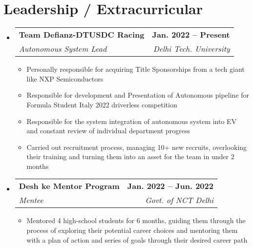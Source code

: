 \documentclass[letterpaper,11pt]{article}
\makeatletter
\newcommand{\resumeItem}[1]{
  \item\small{
    {#1 \vspace{-2pt}}
  }
}
\newcommand{\resumeSubheading}[4]{
  \vspace{-2pt}\item
    \begin{tabular*}{1.0\textwidth}[t]{l@{\extracolsep{\fill}}r}
      \textbf{#1} & \textbf{\small #2} \\
      \textit{\small#3} & \textit{\small #4} \\
    \end{tabular*}\vspace{-7pt}
}
\newcommand{\resumeSubHeadingListStart}{\begin{itemize}[leftmargin=0.0in, label={}]}
\newcommand{\resumeSubHeadingListEnd}{\end{itemize}}
\newcommand{\resumeItemListStart}{\begin{itemize}}
\newcommand{\resumeItemListEnd}{\end{itemize}\vspace{-5pt}}
\makeatother
\begin{document}
\section{Leadership / Extracurricular}
    \resumeSubHeadingListStart
        \resumeSubheading{Team Defianz-DTUSDC Racing}{Jan. 2022 -- Present}{Autonomous System Lead}{Delhi Tech. University}
            \resumeItemListStart
                \resumeItem{Personally responsible for acquiring Title Sponsorships from a tech giant like NXP Semiconductors}
                \resumeItem{Responsible for development and Presentation of Autonomous pipeline for Formula Student Italy 2022 driverless competition}
                \resumeItem{Responsible for the system integration of autonomous system into EV and constant review of individual department progress}
                \resumeItem{Carried out recruitment process, managing 10+ new recruits, overlooking their training and turning them into an asset for the team in under 2 months}
            \resumeItemListEnd


        \resumeSubheading{Desh ke Mentor Program}{Jan. 2022 -- Jun. 2022}{Mentee}{Govt. of NCT Delhi}
            \resumeItemListStart
                \resumeItem{Mentored 4 high-school students for 6 months, guiding them through the process of exploring their potential career choices and mentoring them with a plan of action and series of goals through their desired career path}
            \resumeItemListEnd
        
    \resumeSubHeadingListEnd
\end{document}
